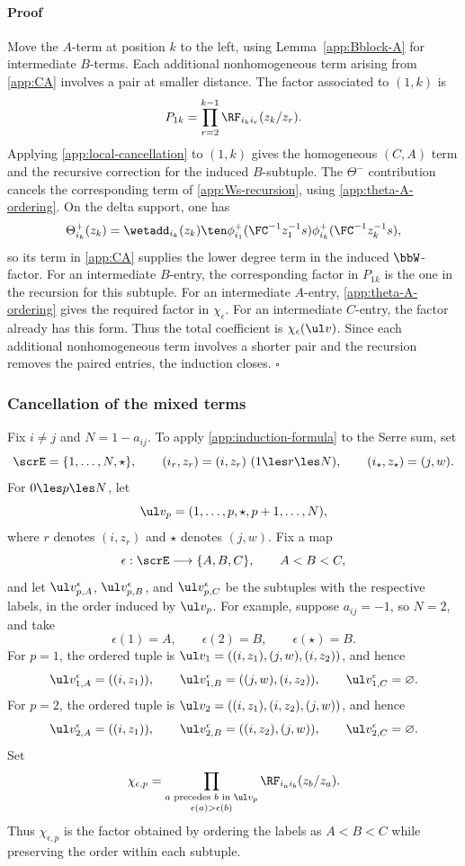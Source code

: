 \documentclass[reqno]{amsart}
\numberwithin{equation}{section}
\newenvironment{pf}{\medskip\paragraph{{\sc Proof}}}{\hfill$\square$\par\medskip}
\begin{document}
\begin{pf}
	Move the $A$-term at position $k$ to the left, using Lemma~\ref{app:Bblock-A} for 
	intermediate $B$-terms. Each additional nonhomogeneous term arising from 
	\eqref{app:CA} involves a pair at smaller distance. The factor associated to $(1,k)$ is
	\[
	P_{1k}=\prod_{r=2}^{k-1}\RF_{i_ki_r}(z_k/z_r).
	\]
	Applying \eqref{app:local-cancellation} to $(1,k)$ gives the homogeneous $(C,A)$ term 
	and the recursive correction for the induced $B$-subtuple.
	The $\Theta^-$ contribution cancels the corresponding term of
	\eqref{app:Ws-recursion}, using \eqref{app:theta-A-ordering}.
	On the delta support, one has
	\[
	\Theta^+_{i_k}(z_k)=\wetadd_{i_k}(z_k)\ten
	\phi_{i_1}^+({\FC^{-1}z_1^{-1}} s)\phi_{i_k}^+({\FC^{-1}z_k^{-1}} s),
	\]
	so its term in \eqref{app:CA} supplies the lower degree term in the induced
	$\bbW$-factor.
	For an intermediate $B$-entry, the corresponding factor in $P_{1k}$ is the one in the recursion for this subtuple. For an intermediate $A$-entry, \eqref{app:theta-A-ordering} gives the required factor in $\chi_\epsilon$. For an intermediate $C$-entry, the factor already has this form. Thus the total coefficient is $\chi_\epsilon(\ul v)$. Since each additional nonhomogeneous term involves a shorter pair and the recursion removes the paired entries, the induction closes.
\end{pf}

\subsubsection[Cancellation of the mixed terms]{Cancellation of the mixed terms}
\label{app:mixed-cancellation}
Fix $i\ne j$ and $N=1-a_{ij}$. To apply \eqref{app:induction-formula} to the Serre sum, set
\[
\scrE=\{1,\ldots,N,\star\},\qquad
(i_r,z_r)=(i,z_r)\ (1\les r\les N),\qquad
(i_\star,z_\star)=(j,w).
\]
For $0\les p\les N$, let
\[
\ul v_p=(1,\ldots,p,\star,p+1,\ldots,N),
\]
where $r$ denotes $(i,z_r)$ and $\star$ denotes $(j,w)$. Fix a map
\[
\epsilon:\scrE\longrightarrow\{A,B,C\},\qquad A<B<C,
\]
and let $\ul v_{p,A}^\epsilon$, $\ul v_{p,B}^\epsilon$, and $\ul v_{p,C}^\epsilon$ be the subtuples with the respective labels, in the order induced by $\ul v_p$. For example, suppose $a_{ij}=-1$, so $N=2$, and take
\[
\epsilon(1)=A,\qquad \epsilon(2)=B,\qquad
\epsilon(\star)=B.
\]
For $p=1$, the ordered tuple is
$\ul v_1=((i,z_1),(j,w),(i,z_2))$, and hence
\[
\ul v_{1,A}^\epsilon=((i,z_1)),\qquad
\ul v_{1,B}^\epsilon=((j,w),(i,z_2)),\qquad
\ul v_{1,C}^\epsilon=\varnothing.
\]
For $p=2$, the ordered tuple is
$\ul v_2=((i,z_1),(i,z_2),(j,w))$, and hence
\[
\ul v_{2,A}^\epsilon=((i,z_1)),\qquad
\ul v_{2,B}^\epsilon=((i,z_2),(j,w)),\qquad
\ul v_{2,C}^\epsilon=\varnothing.
\]
Set
\begin{equation}
	\chi_{\epsilon,p}=
	\prod_{\substack{a\text{ precedes }b\text{ in }\ul v_p\\
			\epsilon(a)>\epsilon(b)}}
	\RF_{i_ai_b}(z_b/z_a).
	\label{app:chi-ep}
\end{equation}
Thus $\chi_{\epsilon,p}$ is the factor obtained by ordering the labels as $A<B<C$ while preserving the order within each subtuple.
\end{document}
